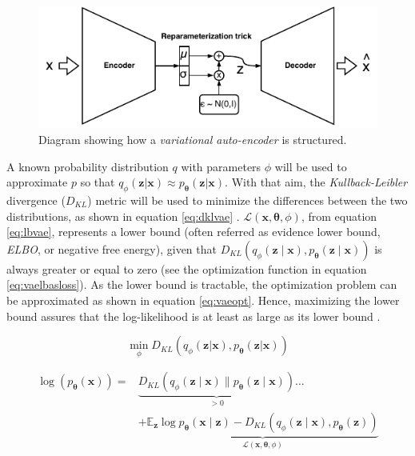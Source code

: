 \begin{figure}[h!]
	\centering
	\includegraphics[width=1\linewidth]{background/images/vae}
	\caption[\textit{Variational auto-encoder}]{Diagram showing how a \textit{variational auto-encoder} is structured. }
	\label{fig:vae}
\end{figure}

A known probability distribution $q$ with parameters $\phi$ will be used to approximate $p$ so that $q_\phi(\mathbf{z}|\mathbf{x}) \approx p_\mathbf{\theta}(\mathbf{z}|\mathbf{x})$. With that aim, the \textit{Kullback-Leibler} divergence ($D_{KL}$) metric will be used to minimize the differences between the two distributions, as shown in equation \ref{eq:dklvae} \autocite{kingma2019}. $\mathcal{L}(\mathbf{x}, \mathbf{\theta}, \phi)$, from equation \ref{eq:lbvae}, represents a lower bound (often referred as evidence lower bound, \textit{ELBO}, or negative free energy), given that $D_{K L}\left(q_{\phi}(\mathbf{z} \mid \mathbf{x}), p_{\mathbf{\theta}}(\mathbf{z} \mid \mathbf{x})\right)$ is always greater or equal to zero (see the optimization function in equation \ref{eq:vaelbasloss}). As the lower bound is tractable, the optimization problem can be approximated as shown in equation \ref{eq:vaeopt}. Hence, maximizing the lower bound assures that the log-likelihood is at least as large as its lower bound \autocite{wei2021}.

\begin{equation}
\label{eq:dklvae}
\min_{\phi} D_{KL}\left(q_\phi(\mathbf{z}|\mathbf{x}), p_\mathbf{\theta}(\mathbf{z}|\mathbf{x})\right)
\end{equation}

\begin{equation}
\label{eq:lbvae}
\begin{aligned}
\log \left(p_{\mathbf{\theta}}(\mathbf{x})\right) =& \underbrace{D_{K L}\left(q_{\phi}(\mathbf{z} \mid \mathbf{x}) \| p_{\mathbf{\theta}}(\mathbf{z} \mid \mathbf{x})\right)}_{>0} \ldots \\
&+\underbrace{\mathbb{E}_{\mathbf{z}} \log p_{\mathbf{\theta}}(\mathbf{x} \mid \mathbf{z})-D_{KL}\left(q_{\phi}(\mathbf{z} \mid \mathbf{x}), p_{\mathbf{\theta}}(\mathbf{z})\right)}_{\mathcal{L}(\mathbf{x}, \mathbf{\theta}, \phi)}
\end{aligned}
\end{equation}

